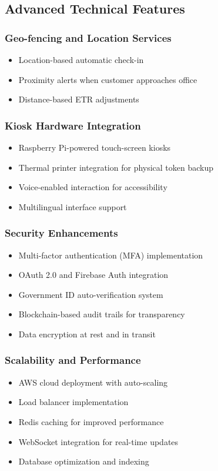 \documentclass[12pt,a4paper]{report}
\begin{document}
\subsection{Advanced Technical Features}

\subsubsection{Geo-fencing and Location Services}
\begin{itemize}
    \item Location-based automatic check-in
    \item Proximity alerts when customer approaches office
    \item Distance-based ETR adjustments
\end{itemize}

\subsubsection{Kiosk Hardware Integration}
\begin{itemize}
    \item Raspberry Pi-powered touch-screen kiosks
    \item Thermal printer integration for physical token backup
    \item Voice-enabled interaction for accessibility
    \item Multilingual interface support
\end{itemize}

\subsubsection{Security Enhancements}
\begin{itemize}
    \item Multi-factor authentication (MFA) implementation
    \item OAuth 2.0 and Firebase Auth integration
    \item Government ID auto-verification system
    \item Blockchain-based audit trails for transparency
    \item Data encryption at rest and in transit
\end{itemize}

\subsubsection{Scalability and Performance}
\begin{itemize}
    \item AWS cloud deployment with auto-scaling
    \item Load balancer implementation
    \item Redis caching for improved performance
    \item WebSocket integration for real-time updates
    \item Database optimization and indexing
\end{itemize}
\end{document}
